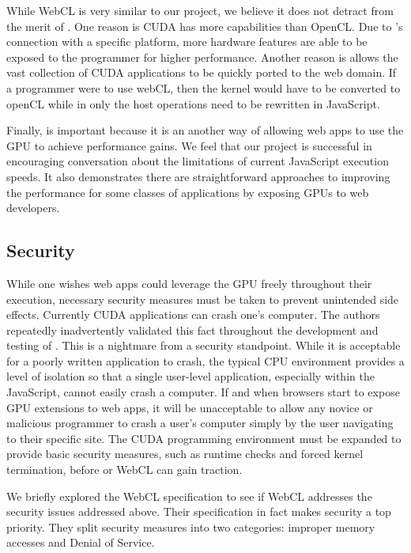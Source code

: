 While WebCL is very similar to our project, we believe it does not detract from
the merit of \namens. One reason is CUDA has more capabilities than OpenCL. Due
to \namens's connection with a specific platform, more hardware features are
able to be exposed to the programmer for higher performance. Another reason is
\name allows the vast collection of CUDA applications to be quickly ported to
the web domain. If a programmer were to use webCL, then the kernel would have to
be converted to openCL while in \name only the host operations need to be
rewritten in JavaScript.

Finally, \name is important because it is an another way of allowing web apps
to use the GPU to achieve performance gains. We feel that our project is
successful in encouraging conversation about the limitations of current JavaScript
execution speeds. It also demonstrates there are straightforward approaches to
improving the performance for some classes of applications by exposing GPUs to
web developers.



\subsection{Security} \label{security} While one wishes web apps could leverage
the GPU freely throughout their execution, necessary security measures must be
taken to prevent unintended side effects. Currently CUDA applications can crash
one's computer.  The authors repeatedly inadvertently validated this fact
throughout the development and testing of \namens. This is a nightmare from a
security standpoint. While it is acceptable for a poorly written application to
crash, the typical CPU environment provides a level of isolation so that a
single user-level application, especially within the JavaScript, cannot easily
crash a computer. If and when browsers start to expose GPU extensions to web
apps, it will be unacceptable to allow any novice or malicious programmer to
crash a user's computer simply by the user navigating to their specific site.
The CUDA programming environment must be expanded to provide basic security
measures, such as runtime checks and forced kernel termination, before \name or
WebCL can gain traction.

We briefly explored the WebCL specification to see if WebCL addresses the
security issues addressed above. Their specification in fact makes security a
top priority. They split security measures into two categories: improper memory
accesses and Denial of Service.

